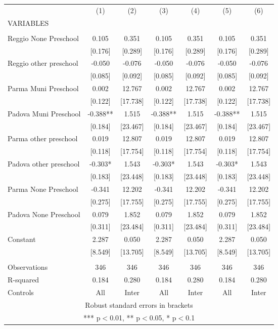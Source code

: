 \begin{tabular}{lcccccc} \hline
 & (1) & (2) & (3) & (4) & (5) & (6) \\
VARIABLES &  &  &  &  &  &  \\ \hline
 &  &  &  &  &  &  \\
Reggio None Preschool & 0.105 & 0.351 & 0.105 & 0.351 & 0.105 & 0.351 \\
 & [0.176] & [0.289] & [0.176] & [0.289] & [0.176] & [0.289] \\
Reggio other preschool & -0.050 & -0.076 & -0.050 & -0.076 & -0.050 & -0.076 \\
 & [0.085] & [0.092] & [0.085] & [0.092] & [0.085] & [0.092] \\
Parma Muni Preschool & 0.002 & 12.767 & 0.002 & 12.767 & 0.002 & 12.767 \\
 & [0.122] & [17.738] & [0.122] & [17.738] & [0.122] & [17.738] \\
Padova Muni Preschool & -0.388** & 1.515 & -0.388** & 1.515 & -0.388** & 1.515 \\
 & [0.184] & [23.467] & [0.184] & [23.467] & [0.184] & [23.467] \\
Parma other preschool & 0.019 & 12.807 & 0.019 & 12.807 & 0.019 & 12.807 \\
 & [0.118] & [17.754] & [0.118] & [17.754] & [0.118] & [17.754] \\
Padova other preschool & -0.303* & 1.543 & -0.303* & 1.543 & -0.303* & 1.543 \\
 & [0.183] & [23.448] & [0.183] & [23.448] & [0.183] & [23.448] \\
Parma None Preschool & -0.341 & 12.202 & -0.341 & 12.202 & -0.341 & 12.202 \\
 & [0.275] & [17.755] & [0.275] & [17.755] & [0.275] & [17.755] \\
Padova None Preschool & 0.079 & 1.852 & 0.079 & 1.852 & 0.079 & 1.852 \\
 & [0.311] & [23.484] & [0.311] & [23.484] & [0.311] & [23.484] \\
Constant & 2.287 & 0.050 & 2.287 & 0.050 & 2.287 & 0.050 \\
 & [8.549] & [13.705] & [8.549] & [13.705] & [8.549] & [13.705] \\
 &  &  &  &  &  &  \\
Observations & 346 & 346 & 346 & 346 & 346 & 346 \\
R-squared & 0.184 & 0.280 & 0.184 & 0.280 & 0.184 & 0.280 \\
 Controls & All & Inter & All & Inter & All & Inter \\ \hline
\multicolumn{7}{c}{ Robust standard errors in brackets} \\
\multicolumn{7}{c}{ *** p$<$0.01, ** p$<$0.05, * p$<$0.1} \\
\end{tabular}
